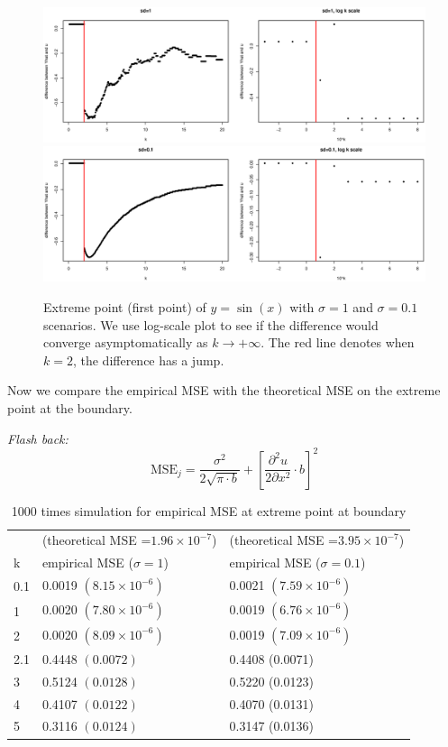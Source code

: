 \documentclass{article}
\begin{document}
\begin{itemize}
\begin{figure}[H]
\includegraphics[width=\linewidth]{pic/sim.plot4.eps}
\includegraphics[width=\linewidth]{pic/sim.plot5.eps}
\caption{Extreme point (first point) of $y=\sin(x)$ with $\sigma = 1$ and  $\sigma = 0.1$ scenarios. We use log-scale plot to see if the difference would converge asymptomatically as $k\rightarrow +\infty$. The red line denotes when $k=2$, the difference has a jump.} 
\end{figure}


Now we compare the empirical MSE with the theoretical MSE on the extreme point at the boundary. 

\textit{Flash back:}
$$\text{MSE}_j=  \frac{\sigma^2}{2\sqrt{\pi \cdot b}}  + \left[\frac{\partial^2 u}{2\partial x^2}\cdot b \right]^2$$

\begin{table}[H]
\centering
\begin{tabular}{l|l| l}
\hline\hline
& (theoretical MSE =$1.96\times 10^{-7}$) & (theoretical MSE =$3.95\times 10^{-7}$)\\
k & empirical MSE  ($\sigma=1$) &empirical MSE  ($\sigma=0.1$) \\\hline 
0.1&0.0019 $(8.15\times 10^{-6})$ & 0.0021 $(7.59\times 10^{-6})$\\
1 & 0.0020 $(7.80\times 10^{-6})$ &0.0019 $(6.76\times 10^{-6})$\\
2 & 0.0020 $(8.09\times 10^{-6})$ &0.0019 $(7.09\times 10^{-6})$\\
2.1 & 0.4448 $(0.0072)$ &0.4408 (0.0071)\\
3 & 0.5124 $(0.0128)$ & 0.5220 (0.0123)\\
4 & 0.4107 $(0.0122)$ & 0.4070 (0.0131)\\
5 & 0.3116 $(0.0124)$ & 0.3147 (0.0136)\\\hline
\end{tabular}
\caption{1000 times simulation for empirical MSE at extreme point at boundary}
\end{table}






\end{itemize}
\end{document}
